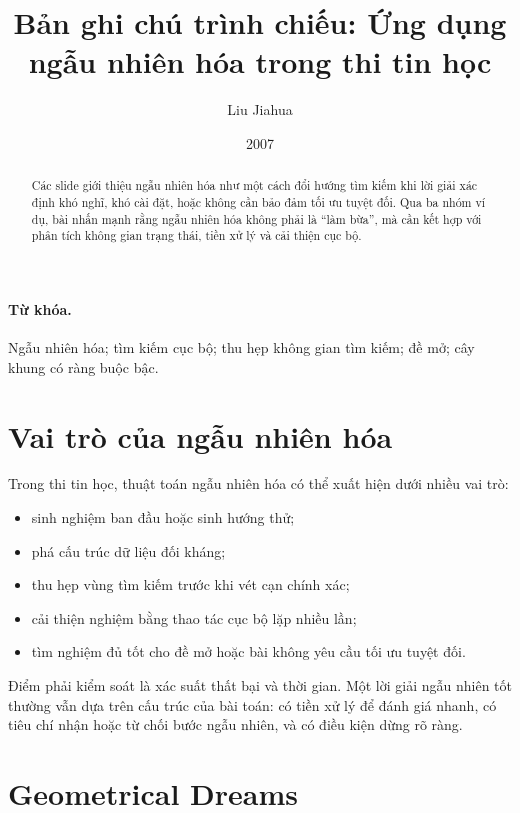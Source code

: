 \documentclass[11pt]{article}
\title{Bản ghi chú trình chiếu: Ứng dụng ngẫu nhiên hóa trong thi tin học}
\author{Liu Jiahua}
\date{2007}
\begin{document}
\maketitle


\begin{abstract}
Các slide giới thiệu ngẫu nhiên hóa như một cách đổi hướng tìm kiếm khi lời
giải xác định khó nghĩ, khó cài đặt, hoặc không cần bảo đảm tối ưu tuyệt đối.
Qua ba nhóm ví dụ, bài nhấn mạnh rằng ngẫu nhiên hóa không phải là ``làm bừa'',
mà cần kết hợp với phân tích không gian trạng thái, tiền xử lý và cải thiện
cục bộ.
\end{abstract}

\paragraph{Từ khóa.}
Ngẫu nhiên hóa; tìm kiếm cục bộ; thu hẹp không gian tìm kiếm; đề mở; cây
khung có ràng buộc bậc.

\section{Vai trò của ngẫu nhiên hóa}

Trong thi tin học, thuật toán ngẫu nhiên hóa có thể xuất hiện dưới nhiều vai
trò:
\begin{itemize}
  \item sinh nghiệm ban đầu hoặc sinh hướng thử;
  \item phá cấu trúc dữ liệu đối kháng;
  \item thu hẹp vùng tìm kiếm trước khi vét cạn chính xác;
  \item cải thiện nghiệm bằng thao tác cục bộ lặp nhiều lần;
  \item tìm nghiệm đủ tốt cho đề mở hoặc bài không yêu cầu tối ưu tuyệt đối.
\end{itemize}

Điểm phải kiểm soát là xác suất thất bại và thời gian. Một lời giải ngẫu
nhiên tốt thường vẫn dựa trên cấu trúc của bài toán: có tiền xử lý để đánh
giá nhanh, có tiêu chí nhận hoặc từ chối bước ngẫu nhiên, và có điều kiện
dừng rõ ràng.

\section{Geometrical Dreams}
\end{document}
